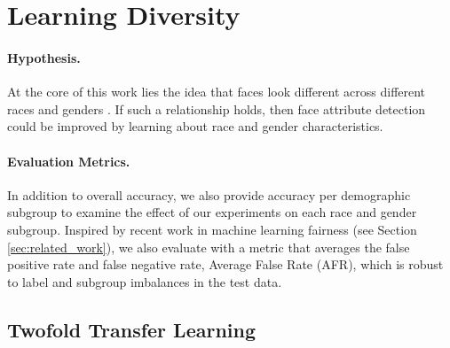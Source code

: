 \documentclass{article}
\begin{document}
\section{Learning Diversity}\label{sec:learning_diversity} %

\paragraph{Hypothesis.}  At the core of this work lies the idea that faces look different across different races and genders \cite{fuetal2014race}.  If such a relationship holds, then face attribute detection could be improved by learning about race and gender characteristics.\vspace{-.5em}

\paragraph{Evaluation Metrics.}  In addition to overall accuracy, we also provide accuracy per demographic subgroup to examine the effect of our experiments on each race and gender subgroup. Inspired by recent work in machine learning fairness (see Section \ref{sec:related_work}), we also evaluate with a metric that averages the false positive rate and false negative rate, Average False Rate (AFR), which is robust to label and subgroup imbalances in the test data.\vspace{-.3em}



\subsection{Twofold Transfer Learning}
\end{document}
